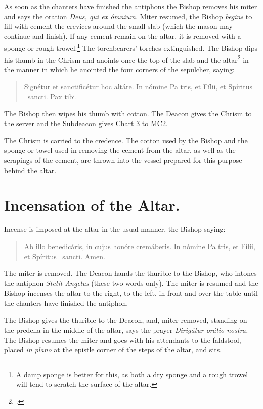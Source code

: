 \documentclass[letterpaper]{report}
\newcommand\blessincense{
\begin{quote}
   Ab illo benedicáris, in cujus honóre cremáberis. In nómine Pa\cross
    tris, et Fí\cross lii, et Spíritus \cross\ sancti. \rbar Amen.
\end{quote}
}
\begin{document}
{    \rubric As soon as the chanters have finished the antiphons the Bishop
    removes his miter and says the oration \textit{Deus, qui ex ómnium.} Miter
    resumed, the Bishop \textit{begins} to fill with cement the crevices around
    the small slab (which the mason may continue and finish). If any cement
    remain on the altar, it is removed with a sponge or rough
    trowel.\footnote{A damp sponge is better for this, as both a dry sponge and
    a rough trowel will tend to scratch the surface of the altar.} The
    torchbearers' torches extinguished. The Bishop dips his thumb in the Chrism
    and anoints once the top of the slab and the altar\footcite[Martinucci,
    Hartmann, Moretti, etc., say that the cross should be made not only on the
    slab, but also on the portions of the table of the altar near the
    slab.][footnote 1, p. 90.]{consecranda} in the manner in which he anointed
    the four corners of the sepulcher, saying:

    \begin{quote}
        Signé\cross tur et sancti\cross ficétur hoc altáre. In nómine Pa\cross
        tris, et Fí\cross lii, et Spíritus \cross\ sancti. Pax tibi.
    \end{quote}

    The Bishop then wipes his thumb with cotton. The Deacon gives the Chrism to the
    server and the Subdeacon gives Chart 3 to MC2.

    The Chrism is carried to the credence. The cotton used by the Bishop and
    the sponge or towel used in removing the cement from the altar, as well as
    the scrapings of the cement, are thrown into the vessel prepared for this
    purpose behind the altar.

    \section{Incensation of the Altar.}

    \rubric Incense is imposed at the altar in the usual manner, the Bishop
    saying:

    \blessincense

    The miter is removed. The Deacon hands the thurible to the Bishop, who
    intones the antiphon \textit{Stetit Angelus} (these two words only). The
    miter is resumed and the Bishop incenses the altar to the right, to the
    left, in front and over the table until the chanters have finished the
    antiphon.

    \rubric The Bishop gives the thurible to the Deacon, and, miter removed,
    standing on the predella in the middle of the altar, says the prayer
    \textit{Dirigátur orátio nostra.} The Bishop resumes the miter and goes
    with his attendants to the faldstool, placed \textit{in plano} at the
    epistle corner of the steps of the altar, and sits.

}
\end{document}
